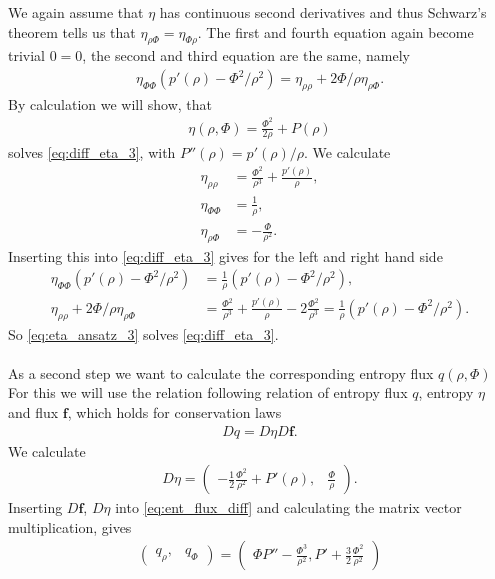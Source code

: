 We again assume that $\eta$ has continuous second derivatives and thus Schwarz's theorem tells us that $\eta_{\rho\Phi}=\eta_{\Phi\rho}$. The first and fourth equation again become trivial $0=0$, the second and third equation are the same, namely
\begin{align}
\eta_{\Phi\Phi}(p'(\rho)-\Phi^2/\rho^2) = \eta_{\rho\rho} +2\Phi/\rho \eta_{\rho \Phi}.\label{eq:diff_eta_3}
\end{align}
By calculation we will show, that 
\begin{align}
\eta(\rho,\Phi)= \frac {\Phi^2}{2\rho} +P(\rho) \label{eq:eta_ansatz_3}
\end{align}
solves \cref{eq:diff_eta_3}, with $P''(\rho)=p'(\rho)/\rho$. We calculate
\begin{align}
\eta_{\rho\rho}&=\frac{\Phi^2}{\rho^3}+\frac{p'(\rho)}{\rho},\\
\eta_{\Phi\Phi}&=\frac 1\rho,\\
\eta_{\rho\Phi}&=-\frac{\Phi}{\rho^2}.
\end{align}
Inserting this into \cref{eq:diff_eta_3} gives for the left and right hand side
\begin{align}
\eta_{\Phi\Phi}(p'(\rho)-\Phi^2/\rho^2)&=\frac 1\rho(p'(\rho)-\Phi^2/\rho^2),\\
 \eta_{\rho\rho} +2\Phi/\rho \eta_{\rho \Phi}& = \frac{\Phi^2}{\rho^3}+\frac{p'(\rho)}{\rho} -2\frac{\Phi^2}{\rho^3} = \frac 1\rho(p'(\rho)-\Phi^2/\rho^2).
\end{align}
So \cref{eq:eta_ansatz_3} solves \cref{eq:diff_eta_3}. \\ \\
As a second step we want to calculate the corresponding entropy flux $ q(\rho,\Phi)$
For this we will use the relation following relation of entropy flux $q$, entropy $\eta$ and flux $\bm f$, which holds for conservation laws
\begin{align}
D q = D\eta D\bm f.\label{eq:ent_flux_diff}
\end{align}
We calculate
\begin{align}
D\eta = \begin{pmatrix}
-\frac 12 \frac{\Phi^2}{\rho^2} +P'(\rho), &
\frac{\Phi}{\rho}
\end{pmatrix}.
\end{align}
Inserting $D\bm f$, $D\eta$ into \cref{eq:ent_flux_diff} and calculating the matrix vector multiplication, gives
\begin{align}
\begin{pmatrix}
q_\rho ,& q_\Phi 
\end{pmatrix}
=\begin{pmatrix}
\Phi P'' -\frac{\Phi^3}{\rho^2}, P' +\frac 32 \frac{\Phi^2}{\rho^2}
\end{pmatrix}\label{eq:der_q}
\end{align}
